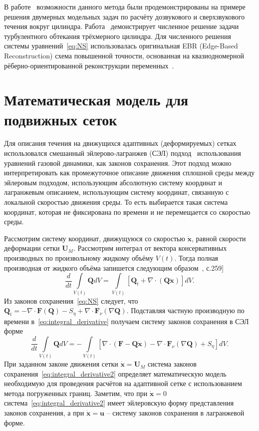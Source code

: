 В работе~\cite{abalakin2015} возможности данного метода были продемонстрированы на примере решения двумерных модельных задач по расчёту дозвукового и сверхзвукового течения вокруг цилиндра.  Работа~\cite{abalakin2018} демонстрирует численное решение задачи турбулентного обтекания трёхмерного цилиндра.
Для численного решения системы уравнений~\eqref{eq:NS} использовалась оригинальная EBR (Edge-Based Reconstruction) схема повышенной точности, основанная на квазиодномерной рёберно-ориентированной реконструкции переменных~\cite{abalakin2016edge}.
\section{Математическая модель для подвижных сеток}
Для описания течения на движущихся адаптивных (деформируемых) сетках использовался смешанный эйлерово-лагранжев (СЭЛ) подход~\cite{hirt1974arbitrary, golovizin1981} использования уравнений газовой динамики, как законов сохранения. Этот подход можно интерпретировать как промежуточное описание движения сплошной среды между эйлеровым подходом, использующим абсолютную систему координат и лагранжевым описанием, использующим систему координат, связанную с локальной скоростью движения среды. То есть выбирается такая система координат, которая не фиксирована по времени и не перемещается со скоростью среды. 

Рассмотрим систему координат, движущуюся со скоростью $\dot{\mathbf{x}}$, равной скорости деформации сетки $\mathbf{U}_M$. Рассмотрим интеграл от вектора консервативных производных по произвольному жидкому объёму $V(t)$. Тогда полная производная от жидкого объёма запишется следующим образом~\cite{budak2002}, с.259]
\begin{equation}\label{eq:integral_derivative}
\frac{d}{dt}\int \limits_{V(t)}\mathbf{Q}dV = \int \limits_{V(t)}\left[\mathbf{Q}_t + \nabla \cdot (\mathbf{Q}\dot{\mathbf{x}})\right]dV .
\end{equation}
Из законов сохранения~\eqref{eq:NS} следует, что $\mathbf{Q}_t = -\nabla \cdot \mathbf{F}(\mathbf{Q})-S_{\eta} + \nabla\cdot\mathbf{F}_{\nu}(\nabla \mathbf{Q})$. Подставляя частную производную по времени в~\eqref{eq:integral_derivative} получаем систему законов сохранения в СЭЛ форме
\begin{equation}\label{eq:integral_derivative2}
\frac{d}{dt}\int \limits_{V(t)}\mathbf{Q}dV = 
-\int \limits_{V(t)}\left[ \nabla \cdot(\mathbf{F} - \mathbf{Q}\dot{\mathbf{x}}) - \nabla\cdot\mathbf{F}_{\nu}(\nabla \mathbf{Q}) + S_{\eta} \right] dV .
\end{equation}
При заданном законе движения сетки  $\dot{\mathbf{x}} = \mathbf{U}_M$ система законов сохранения~\eqref{eq:integral_derivative2} определяет математическую модель необходимую для проведения расчётов на адаптивной сетке с использованием метода погруженных границ. Заметим, что при  $\dot{\mathbf{x}} = 0$ система~\eqref{eq:integral_derivative2} имеет эйлеровскую форму представления законов сохранения, а при $\dot{\mathbf{x}} = \mathbf{u}$  – систему законов сохранения в лагранжевой форме.
